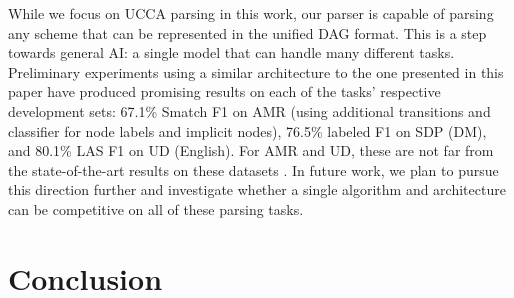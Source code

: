\documentclass[11pt,a4paper]{article}
\begin{document}
While we focus on UCCA parsing in this work, our parser is capable of parsing any
scheme that can be represented in the unified DAG format.
This is a step towards general AI: a single model that can handle many different tasks.
Preliminary experiments using a similar architecture to the one presented in this paper have produced
promising results on each of the tasks' respective development sets:
67.1\% Smatch F1 \cite{cai2013smatch} on AMR
(using additional transitions and classifier for node labels and implicit nodes),
76.5\% labeled F1 on SDP (DM),
and 80.1\% LAS F1 on UD (English).
For AMR and UD, these are not far from the state-of-the-art results on these datasets
\cite{foland2017abstract,dozat2016deep}.
In future work, we plan to pursue this direction further and investigate whether a single
algorithm and architecture can be competitive on all of these parsing tasks.

\section{Conclusion}




\end{document}
